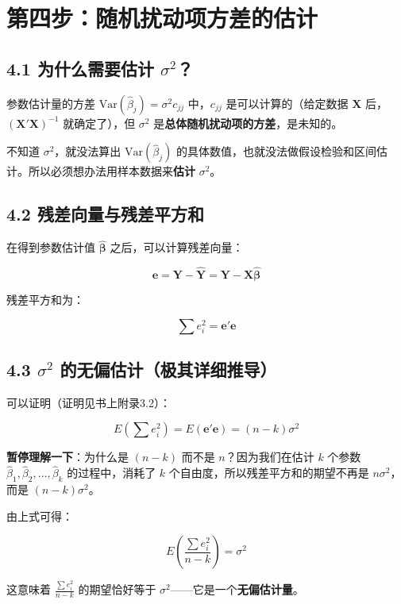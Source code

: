 \documentclass[12pt,a4paper]{ctexart}
\begin{document}
\section{第四步：随机扰动项方差的估计}

\subsection{4.1 为什么需要估计 $\sigma^2$？}

参数估计量的方差 $\text{Var}(\hat{\beta}_j) = \sigma^2 c_{jj}$ 中，$c_{jj}$ 是可以计算的（给定数据 $\mathbf{X}$ 后，$(\mathbf{X}'\mathbf{X})^{-1}$ 就确定了），但 $\sigma^2$ 是\textbf{总体随机扰动项的方差}，是未知的。

不知道 $\sigma^2$，就没法算出 $\text{Var}(\hat{\beta}_j)$ 的具体数值，也就没法做假设检验和区间估计。所以必须想办法用样本数据来\textbf{估计} $\sigma^2$。

\subsection{4.2 残差向量与残差平方和}

在得到参数估计值 $\hat{\boldsymbol{\beta}}$ 之后，可以计算残差向量：

\[
\mathbf{e} = \mathbf{Y} - \hat{\mathbf{Y}} = \mathbf{Y} - \mathbf{X}\hat{\boldsymbol{\beta}}
\]

残差平方和为：

\[
\sum e_i^2 = \mathbf{e}'\mathbf{e}
\]

\subsection{4.3 $\sigma^2$ 的无偏估计（极其详细推导）}

可以证明（证明见书上附录3.2）：

\[
E\left(\sum e_i^2\right) = E(\mathbf{e}'\mathbf{e}) = (n - k)\sigma^2
\]

\textbf{暂停理解一下}：为什么是 $(n-k)$ 而不是 $n$？因为我们在估计 $k$ 个参数 $\hat{\beta}_1, \hat{\beta}_2, \ldots, \hat{\beta}_k$ 的过程中，消耗了 $k$ 个自由度，所以残差平方和的期望不再是 $n\sigma^2$，而是 $(n-k)\sigma^2$。

由上式可得：

\begin{equation}
E\left(\frac{\sum e_i^2}{n - k}\right) = \sigma^2 \tag{3.35}
\end{equation}

这意味着 $\frac{\sum e_i^2}{n-k}$ 的期望恰好等于 $\sigma^2$——它是一个\textbf{无偏估计量}。
\end{document}
